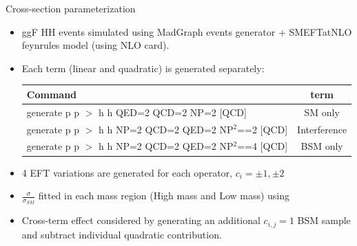\begin{frame}{Cross-section parameterization}
\begin{itemize}
    \item ggF HH events simulated using MadGraph events generator + SMEFTatNLO feynrules model (using NLO card).
    \item Each term (linear and quadratic) is generated separately: 
    
    \begin{table}[]
        \centering
        \begin{tabular}{lc}
        \hline\hline
            Command & term \\
        \hline    
            generate p p $>$ h h  QED=2 QCD=2 NP=2 [QCD] & SM only \\ 
            generate p p $>$ h h NP=2 QCD=2 QED=2 NP$^2$==2 [QCD] & Interference \\
            generate p p $>$ h h NP=2 QCD=2 QED=2 NP$^2$==4 [QCD]  & BSM only \\
        \hline\hline    
        \end{tabular}
    \end{table}
    \item 4 EFT variations are generated for each operator, $c_{i} = \pm1, \pm2$
    \item $\frac{\sigma}{\sigma_{SM}}$ fitted in each mass region (High mass and Low mass) using
    \item Cross-term effect considered by generating an additional $c_{i,j} = 1$ BSM sample and subtract individual quadratic contribution. 
\end{itemize}    
\end{frame}

